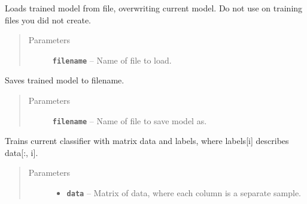 \documentclass[letterpaper,10pt,english]{sphinxmanual}
\begin{document}
\begin{fulllineitems}
\begin{fulllineitems}
\end{fulllineitems}


\begin{fulllineitems}
\label{eigenfish.classify:eigenfish.classify.classify.Classifier.load}
Loads trained model from file, overwriting current model. Do not use on
training files you did not create.
\begin{quote}\begin{description}
\item[{Parameters}] \leavevmode
\textbf{\texttt{filename}} -- Name of file to load.

\end{description}\end{quote}

\end{fulllineitems}


\begin{fulllineitems}
\label{eigenfish.classify:eigenfish.classify.classify.Classifier.save}
Saves trained model to filename.
\begin{quote}\begin{description}
\item[{Parameters}] \leavevmode
\textbf{\texttt{filename}} -- Name of file to save model as.

\end{description}\end{quote}

\end{fulllineitems}


\begin{fulllineitems}
\label{eigenfish.classify:eigenfish.classify.classify.Classifier.train}
Trains current classifier with matrix data and labels, where labels{[}i{]}
describes data{[}:, i{]}.
\begin{quote}\begin{description}
\item[{Parameters}] \leavevmode\begin{itemize}
\item {} 
\textbf{\texttt{data}} -- Matrix of data, where each column is a separate sample.


\end{itemize}
\end{description}
\end{quote}
\end{fulllineitems}
\end{fulllineitems}
\end{document}
